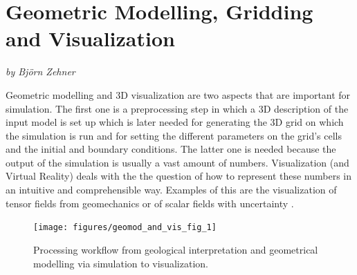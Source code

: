 \chapter{Geometric Modelling, Gridding and Visualization}
\textit{by Bj\"orn Zehner}

\bigskip

Geometric modelling and 3D visualization are two aspects that are important for simulation. The first one is a preprocessing step in which a 3D description of the input model is set up which is later needed for generating the 3D grid on which the simulation is run and for setting the different parameters on the grid's cells and the initial and boundary conditions. The latter one  is needed because the output of the simulation is usually a vast amount of numbers. Visualization (and Virtual Reality) deals with the the question of how to represent these numbers in an intuitive and comprehensible way. Examples of this are the visualization of tensor fields from geomechanics \cite{zehner:2006} or of scalar fields with uncertainty \cite{Zehner:2010:Uncertainty}.

\begin{figure}[tb]
\begin{center}
\texttt{[image: figures/geomod\_and\_vis\_fig\_1]}
\caption{Processing workflow from geological interpretation and geometrical modelling via simulation to visualization.}
\label{geomod_and_vis:1}
\end{center}
\end{figure}

